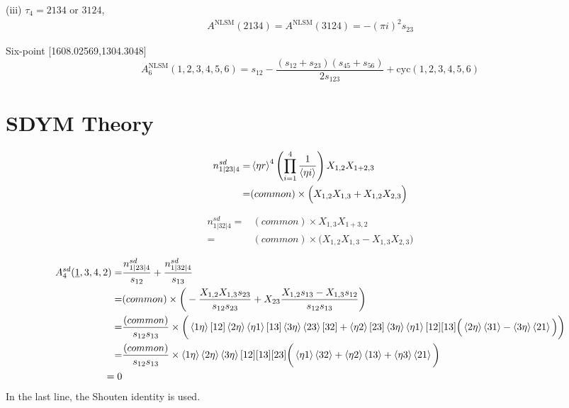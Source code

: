 \documentclass[a4paper,11pt]{article}
\begin{document}
(iii) $\tau_4=2134$ or $3124$,
\begin{equation}
    \begin{split}
    A^{\text{NLSM}}(2134)=A^{\text{NLSM}}(3124)=-(\pi i)^2 s_{23}
    \end{split}
\end{equation}

Six-point [1608.02569,1304.3048]
\begin{equation}
    A^{\text{NLSM}}_6(1,2,3,4,5,6)=s_{12}-\frac{(s_{12}+s_{23})(s_{45}+s_{56})}{2s_{123}}+\text{cyc}(1,2,3,4,5,6)
\end{equation}

\section{SDYM Theory}
\begin{equation}
    \begin{split}
    n^{sd}_{1|23|4}=&\braket{\eta r}^4\left(\prod_{i=1}^4 \frac{1}{\braket{\eta i}}\right)X_{1,2}X_{1+2,3}\\
    =&(common)\times\Big(X_{1,2}X_{1,3}+X_{1,2}X_{2,3}\Big)
    \end{split}
\end{equation}

\begin{equation}
    \begin{split}
    n^{sd}_{1|32|4}=&(common)\times X_{1,3}X_{1+3,2}\\
    =&(common)\times \Big(X_{1,2}X_{1,3}-X_{1,3}X_{2,3}\Big)
    \end{split}
\end{equation}

\begin{equation}
    \begin{split}
    A^{sd}_4(\underline{1},3,4,2)=&\frac{n^{sd}_{1|23|4}}{s_{12}}+\frac{n^{sd}_{1|32|4}}{s_{13}}\\
    =&(common)\times\bigg( -\frac{X_{1,2}X_{1,3}s_{23}}{s_{12}s_{23}}+X_{23}\frac{X_{1,2}s_{13}-X_{1,3}s_{12}}{s_{12}s_{13}}\bigg)\\
    =&\frac{(common)}{s_{12}s_{13}}\times\bigg(\braket{1\eta }[12]\braket{2\eta}\braket{\eta 1}[13]\braket{3\eta}\braket{23}[32]+
    \braket{\eta 2}[23]\braket{3\eta}\braket{\eta 1}[12][13]\Big(\braket{2\eta}\braket{31}-\braket{3\eta}\braket{21}\Big)\bigg)\\
    =&\frac{(common)}{s_{12}s_{13}}\times \braket{1\eta}\braket{2\eta}\braket{3\eta}[12][13][23]\bigg(\braket{\eta 1}\braket{32}+\braket{\eta 2}\braket{13}+\braket{\eta 3}\braket{21}\bigg)\\
    =0
    \end{split}
\end{equation}
In the last line, the Shouten identity is used.
\end{document}
